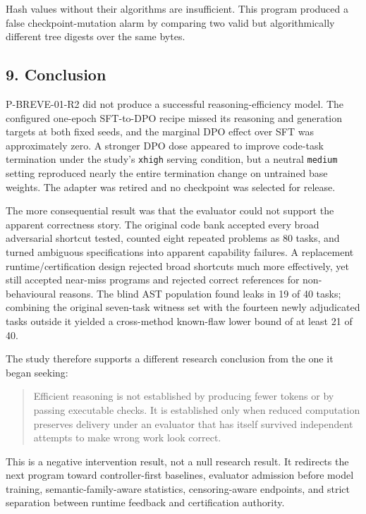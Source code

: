 \documentclass[
  9pt,
  letterpaper,
]{article}
\begin{document}
Hash values without their algorithms are insufficient. This program
produced a false checkpoint-mutation alarm by comparing two valid but
algorithmically different tree digests over the same bytes.

\hypertarget{9-conclusion}{%
\subsection{9. Conclusion}\label{9-conclusion}}

P-BREVE-01-R2 did not produce a successful reasoning-efficiency model.
The configured one-epoch SFT-to-DPO recipe missed its reasoning and
generation targets at both fixed seeds, and the marginal DPO effect over
SFT was approximately zero. A stronger DPO dose appeared to improve
code-task termination under the study's \texttt{xhigh} serving
condition, but a neutral \texttt{medium} setting reproduced nearly the
entire termination change on untrained base weights. The adapter was
retired and no checkpoint was selected for release.

The more consequential result was that the evaluator could not support
the apparent correctness story. The original code bank accepted every
broad adversarial shortcut tested, counted eight repeated problems as 80
tasks, and turned ambiguous specifications into apparent capability
failures. A replacement runtime/certification design rejected broad
shortcuts much more effectively, yet still accepted near-miss programs
and rejected correct references for non-behavioural reasons. The blind
AST population found leaks in 19 of 40 tasks; combining the original
seven-task witness set with the fourteen newly adjudicated tasks outside
it yielded a cross-method known-flaw lower bound of at least 21 of 40.

The study therefore supports a different research conclusion from the
one it began seeking:

\begin{quote}
Efficient reasoning is not established by producing fewer tokens or by
passing executable checks. It is established only when reduced
computation preserves delivery under an evaluator that has itself
survived independent attempts to make wrong work look correct.
\end{quote}

This is a negative intervention result, not a null research result. It
redirects the next program toward controller-first baselines, evaluator
admission before model training, semantic-family-aware statistics,
censoring-aware endpoints, and strict separation between runtime
feedback and certification authority.
\end{document}
